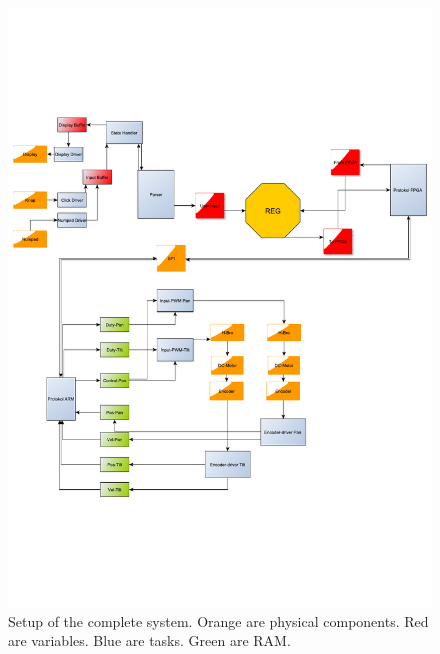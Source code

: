 \begin{figure}[htb]
	\centering
	\includegraphics[width=\textwidth,clip,trim=0 150 0 150]{graphics/Project4GreaterPresentation3.pdf}
	\caption{Setup of the complete system. Orange are physical components. Red are variables. Blue are tasks. Green are RAM. }
	\label{fig:completesystem}			%
\end{figure}